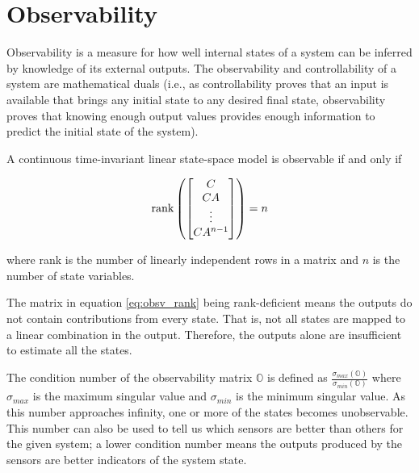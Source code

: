 \section{Observability}

Observability is a measure for how well internal \glspl{state} of a \gls{system}
can be inferred by knowledge of its external \glspl{output}. The observability
and controllability of a \gls{system} are mathematical duals (i.e., as
controllability proves that an \gls{input} is available that brings any initial
\gls{state} to any desired final \gls{state}, observability proves that knowing
enough \gls{output} values provides enough information to predict the initial
\gls{state} of the \gls{system}).

\begin{theorem}[Observability]
  A continuous \gls{time-invariant} linear state-space \gls{model} is observable
  if and only if

  \begin{equation}
    \operatorname{rank}\left(
    \begin{bmatrix}
      C \\
      CA \\
      \vdots \\
      CA^{n-1}
    \end{bmatrix}\right) = n \label{eq:obsv_rank}
  \end{equation}

  where rank is the number of linearly independent rows in a matrix and $n$ is
  the number of \gls{state} variables.
\end{theorem}

The matrix in equation \eqref{eq:obsv_rank} being rank-deficient means the
\glspl{output} do not contain contributions from every \gls{state}. That is, not
all \glspl{state} are mapped to a linear combination in the \gls{output}.
Therefore, the \glspl{output} alone are insufficient to estimate all the
\glspl{state}.

The condition number of the observability matrix $\mathbb{O}$ is defined as
$\frac{\sigma_{max}(\mathbb{O})}{\sigma_{min}(\mathbb{O})}$ where $\sigma_{max}$
is the maximum singular value and $\sigma_{min}$ is
the minimum singular value. As this number approaches infinity, one or more of
the \glspl{state} becomes unobservable. This number can also be used to tell us
which sensors are better than others for the given \gls{system}; a lower
condition number means the \glspl{output} produced by the sensors are better
indicators of the \gls{system} \gls{state}.
